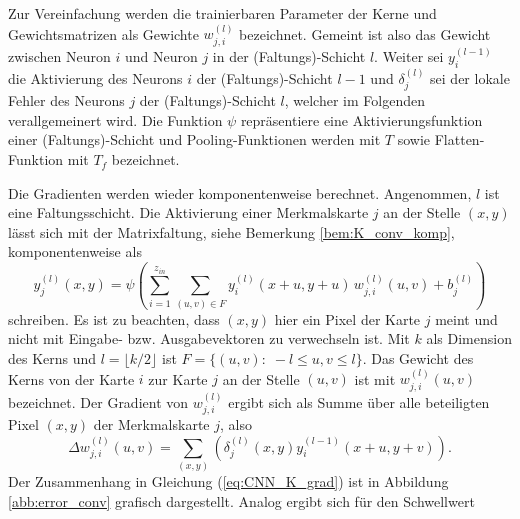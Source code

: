 Zur Vereinfachung werden die trainierbaren Parameter der Kerne und Gewichtsmatrizen als Gewichte $w_{j,i}^{(l)}$ bezeichnet. Gemeint ist also das Gewicht zwischen Neuron $i$  und Neuron $j$ in der (Faltungs)-Schicht $l$. Weiter sei $y_{i}^{(l-1)}$ die Aktivierung des Neurons $i$ der (Faltungs)-Schicht $l-1$ und $\delta_j^{(l)}$ sei der lokale Fehler des Neurons $j$ der (Faltungs)-Schicht $l$, welcher im Folgenden verallgemeinert wird. Die Funktion $\psi$ repräsentiere eine Aktivierungsfunktion einer  (Faltungs)-Schicht und Pooling-Funktionen werden mit $T$ sowie Flatten-Funktion mit $T_f$ bezeichnet.

Die Gradienten werden wieder komponentenweise berechnet.
Angenommen, $l$ ist eine Faltungsschicht. Die Aktivierung einer Merkmalskarte $j$ an der Stelle $(x,y)$ lässt sich mit der Matrixfaltung, siehe Bemerkung \ref{bem:K_conv_komp}, komponentenweise als
\begin{equation}
    y_j^{(l)}(x,y) =\psi \left(\sum_{i=1}^{z_{in}} \sum_{(u,v) \in F} y_i^{(l)}(x+u,y+u)\,  w_{j,i}^{(l)}(u,v) +b_j^{(l)}\right)
\end{equation}   
schreiben. Es ist zu beachten, dass $(x,y)$ hier ein Pixel der Karte $j$ meint und nicht mit Eingabe- bzw. Ausgabevektoren zu verwechseln ist. Mit $k$ als Dimension des Kerns und $l=\lfloor k/2 \rfloor$ ist $F=\{(u,v): \; -l \leq u,v \leq l\}$.
Das Gewicht des Kerns von der Karte $i$ zur Karte $j$ an der Stelle $(u,v)$ ist mit $w^{(l)}_{j,i}(u,v)$ bezeichnet. Der Gradient von $w_{j,i}^{(l)}$ ergibt sich als Summe über alle beteiligten Pixel $(x,y)$ der Merkmalskarte $j$, also
\begin{equation}
    \label{eq:CNN_K_grad}
    \Delta w_{j,i}^{(l)}(u,v)= \sum_{(x,y)} \left(\delta_j^{(l)}(x,y)  y_i^{(l-1)}(x+u,y+v)\right).
\end{equation}
Der Zusammenhang in Gleichung (\ref{eq:CNN_K_grad}) ist in Abbildung \ref{abb:error_conv} grafisch dargestellt. Analog ergibt sich für den Schwellwert

